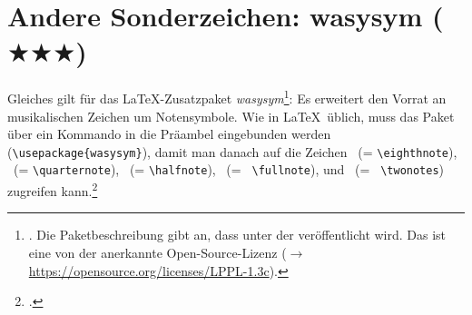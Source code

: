 %
%
%



\section{Andere Sonderzeichen: wasysym ($\bigstar\bigstar\bigstar$)}

Gleiches gilt für das \LaTeX-Zusatzpaket
\textit{wasysym}\footnote{\cite[vgl.][\nopage wp]{CtanWasysym2018a}.
Die Paketbeschreibung gibt an, dass  unter der  veröffentlicht wird. Das ist eine von der  anerkannte
Open-Source-Lizenz ($\rightarrow$
\href{https://opensource.org/licenses/LPPL-1.3c}
{https://opensource.org/licenses/LPPL-1.3c}).}: Es erweitert den Vorrat an
musikalischen Zeichen um Notensymbole. Wie in \LaTeX\ üblich, muss das Paket
über ein Kommando in die Präambel eingebunden werden
(\texttt{\textbackslash{usepackage\{wasysym\}}}), damit man danach auf die
Zeichen \eighthnote \ (= \texttt{\small \textbackslash{eighthnote}}),
\quarternote \ (= \texttt{\small \textbackslash{quarternote}}), \halfnote \ (=
\texttt{\small \textbackslash{halfnote}}), \fullnote \ (= \texttt{\small
\textbackslash{fullnote}}), und \twonotes \ (= \texttt{\small
\textbackslash{twonotes}}) zugreifen kann.\footcite[vgl.][2]{Kielhorn2003a}

